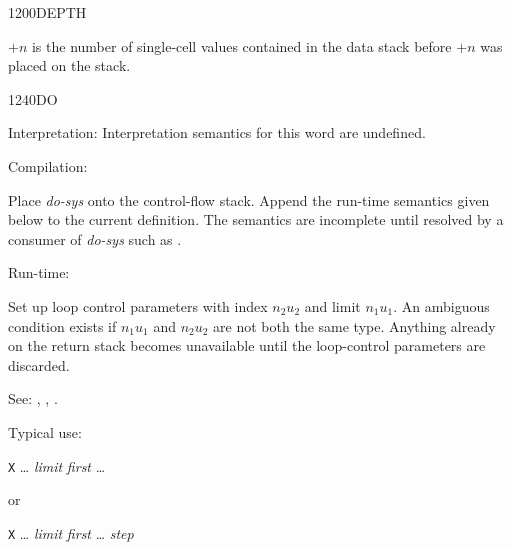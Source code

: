 \begin{newword}{1200}{DEPTH}

	$+n$ is the number of single-cell values contained in the data
	stack before $+n$ was placed on the stack.
\end{newword}


\begin{newword*}{1240}{DO}
\item[Interpretation:]	
	Interpretation semantics for this word are undefined.

\item[Compilation:]

	Place \emph{do-sys} onto the control-flow stack. Append the
	run-time semantics given below to the current definition. The
	semantics are incomplete until resolved by a consumer of
	\emph{do-sys} such as .

\item[Run-time:]

	Set up loop control parameters with index $n_2$\textbar$u_2$ and
	limit $n_1$\textbar$u_1$. An ambiguous condition exists if
	$n_1$\textbar$u_1$ and $n_2$\textbar$u_2$ are not both the same
	type. Anything already on the return stack becomes unavailable
	until the loop-control parameters are discarded.

\item[See:]
	,
	,
	.

	\begin{rationale} %
		Typical use:

		\tab \word{:} \texttt{X} {\ldots}
			\emph{limit} \emph{first} 
				{\ldots}
		\word{;}

		or

		\tab \word{:} \texttt{X} {\ldots}
			\emph{limit} \emph{first} 
				{\ldots}
			\emph{step} 
		\word{;}
	\end{rationale}
\end{newword*}


